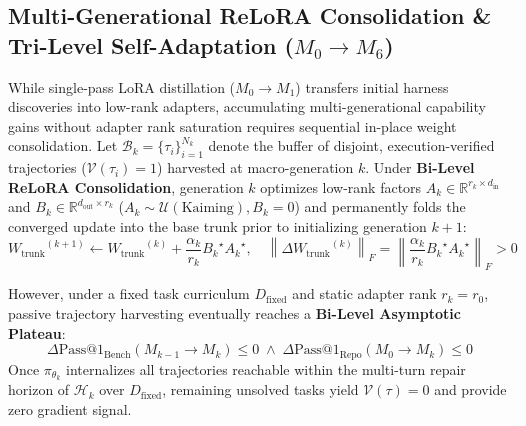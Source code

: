 \documentclass[10pt,twocolumn,letterpaper]{article}
\begin{document}
\subsection{Multi-Generational ReLoRA Consolidation \& Tri-Level Self-Adaptation ($M_{0}\to M_{6}$)}
\label{subsec:trilevel_theory}
While single-pass LoRA distillation ($M_{0}\to M_{1}$) transfers initial harness discoveries into low-rank adapters, accumulating multi-generational capability gains without adapter rank saturation requires sequential in-place weight consolidation. Let $\mathcal{B}_{k}=\{\tau_{i}\}_{i=1}^{N_{k}}$ denote the buffer of disjoint, execution-verified trajectories ($\mathcal{V}(\tau_{i})=1$) harvested at macro-generation $k$. Under \textbf{Bi-Level ReLoRA Consolidation}, generation $k$ optimizes low-rank factors $A_{k}\in\mathbb{R}^{r_{k}\times d_{\text{in}}}$ and $B_{k}\in\mathbb{R}^{d_{\text{out}}\times r_{k}}$ ($A_{k}\sim\mathcal{U}(\text{Kaiming}), B_{k}=0$) and permanently folds the converged update into the base trunk prior to initializing generation $k+1$:
\begin{equation}
{W_{\text{trunk}}}^{(k+1)} \leftarrow {W_{\text{trunk}}}^{(k)} + \frac{\alpha_{k}}{r_{k}} {B_{k}}^{\star} {A_{k}}^{\star}, \quad \left\|\Delta {W_{\text{trunk}}}^{(k)}\right\|_{F} = \left\|\frac{\alpha_{k}}{r_{k}} {B_{k}}^{\star} {A_{k}}^{\star}\right\|_{F} > 0
\end{equation}

However, under a fixed task curriculum $D_{\text{fixed}}$ and static adapter rank $r_{k}=r_{0}$, passive trajectory harvesting eventually reaches a \textbf{Bi-Level Asymptotic Plateau}:
\begin{equation}
\Delta\text{Pass@1}_{\text{Bench}}\!\left(M_{k-1}\to M_{k}\right) \le 0 \;\wedge\; \Delta\text{Pass@1}_{\text{Repo}}\!\left(M_{0}\to M_{k}\right) \le 0
\end{equation}
Once $\pi_{\theta_{k}}$ internalizes all trajectories reachable within the multi-turn repair horizon of $\mathcal{H}_{k}$ over $D_{\text{fixed}}$, remaining unsolved tasks yield $\mathcal{V}(\tau)=0$ and provide zero gradient signal.
\end{document}
